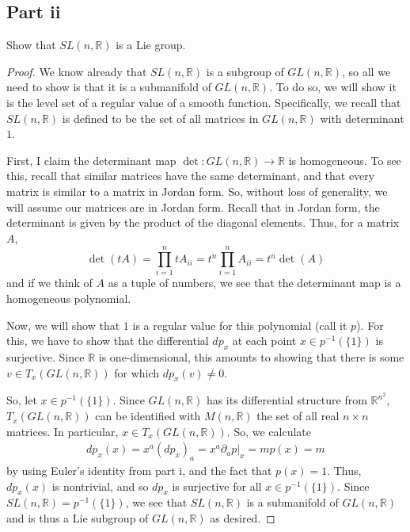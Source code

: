 \documentclass[fontsize=11pt]{scrartcl} %
\numberwithin{equation}{section} %
\numberwithin{figure}{section} %
\numberwithin{table}{section} %
\newcommand{\R}{\mathbb{R}}
\begin{document}
\subsection*{Part ii}
Show that $SL(n,\R)$ is a Lie group.

\begin{proof}
    We know already that $SL(n,\R)$ is a subgroup of $GL(n,\R)$, so all we need
    to show is that it is a submanifold of $GL(n,\R)$. To do so, we will show it
    is the level set of a regular value of a smooth function. Specifically, we
    recall that $SL(n,\R)$ is defined to be the set of all matrices in
    $GL(n,\R)$ with determinant $1$.

    First, I claim the determinant map $\det:GL(n,\R)\to \R$ is homogeneous. To
    see this, recall that similar matrices have the same determinant, and that
    every matrix is similar to a matrix in Jordan form. So, without loss of
    generality, we will assume our matrices are in Jordan form. Recall that in
    Jordan form, the determinant is given by the product of the diagonal
    elements. Thus, for a matrix $A$,
    \[
        \det(tA) = \prod_{i=1}^n tA_{ii} = t^n\prod_{i=1}^n A_{ii} = t^n\det(A)
    \]
    and if we think of $A$ as a tuple of numbers, we see that the determinant
    map is a homogeneous polynomial.

    Now, we will show that $1$ is a regular value for this polynomial (call it
    $p$). For this, we have to show that the differential $dp_x$ at each point
    $x\in p^{-1}(\{1\})$ is surjective. Since $\R$ is one-dimensional, this
    amounts to showing that there is some $v\in T_x(GL(n,\R))$ for which
    $dp_x(v)\neq 0$.

    So, let $x\in p^{-1}(\{1\})$. Since $GL(n,\R)$ has its differential
    structure from $\R^{n^2}$, $T_x(GL(n,\R))$ can be identified with $M(n,\R)$
    the set of all real $n\times n$ matrices. In particular, $x\in
    T_x(GL(n,\R))$. So, we calculate
    \[
\begin{aligned}
    dp_x(x) = x^a(dp_x)_a = x^a\partial_ap|_x = mp(x) = m
\end{aligned}
    \]
    by using Euler's identity from part i, and the fact that $p(x)=1$. Thus,
    $dp_x(x)$ is nontrivial, and so $dp_x$ is surjective for all $x\in
    p^{-1}(\{1\})$. Since $SL(n,\R)=p^{-1}(\{1\})$, we see that $SL(n,\R)$ is a
    submanifold of $GL(n,\R)$ and is thus a Lie subgroup of $GL(n,\R)$ as
    desired.
\end{proof}

\newpage
\end{document}
